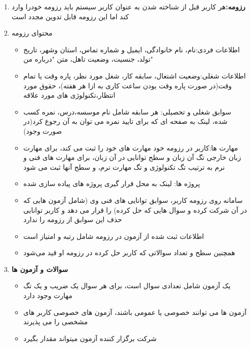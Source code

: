 \documentclass{article}
\begin{document}
\begin{enumerate}[\hspace{1cm}1.]
        \pagebreak

        \item \textbf{رزومه:}هر کاربر قبل از شناخته شدن به عنوان کاربر سیستم باید رزومه خودرا وارد کند اما این رزومه قابل تدوین مجدد است
        \item محتوای رزومه
        \begin{itemize}
            \item اطلاعات فردی:نام، نام خانوادگی، ایمیل و شماره تماس، استان وشهر، تاریخ تولد، جنسیت، وضعیت تاهل، متن "درباره من"
            \item اطلاعات شغلی:وضعیت اشتغال، سابقه کار، شغل مورد نظر، پاره وقت یا تمام وقت(در صورت پاره وقت بودن ساعت کاری به ازا هر هفته)، حقوق مورد انتظار،تکنولوژی های مورد علاقه
            \item سوابق شغلی و تحصیلی: هر سابقه شامل نام موسسه،درس، نمره کسب شده، لینک به صفحه ای که برای تایید نمره می توان به آن رجوع کرد(در صورت وجود)
            \item مهارت ها:کاربر در رزومه خود مهارت های خود را ثبت می کند، برای مهارت زبان خارجی تگ آن زبان و سطح توانایی در آن زبان، برای مهارت های فنی و نرم به ترتیب تگ تکنولوژی و تگ مهارت نرم، و سطح آنها ثبت می شود 
            \item پروژه ها: لینک به محل قرار گیری پروژه های پیاده سازی شده
            \item سامانه روی رزومه کاربر، سوابق توانایی های فنی وی (شامل آزمون هایی که در آن شرکت کرده و سوال هایی که حل کرده) را قرار می دهد و کاربر توانایی حذف این سوابق از رزومه را ندارد     
            \item اطلاعات ثبت شده از آزمون در رزومه شامل رتبه و امتیاز است
            \item همچنین سطح و تعداد سوالاتی که کاربر حل کرده در رزومه او قید می‌شود
        \end{itemize}
        
        \item \textbf{سوالات و آزمون ها}
        \begin{itemize}
            \item  یک آزمون شامل تعدادی سوال است، برای هر سوال یک ضریب و یک تگ مهارت وجود دارد
            \item آزمون ها می توانند خصوصی یا عمومی باشند، آزمون های خصوصی کاربر های مشخصی را می پذیرند
            \item شرکت برگزار کننده آزمون میتواند مقدار  بگیرد
            

\end{itemize}
\end{enumerate}
\end{document}
